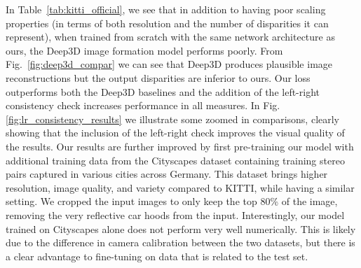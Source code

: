 \documentclass[10pt,twocolumn,letterpaper]{article}
\begin{document}
In Table~\ref{tab:kitti_official}, we see that in addition to having poor scaling properties (in terms of both resolution and the number of disparities it can represent), when trained from scratch with the same network architecture as ours, the Deep3D \cite{xie2016deep3d} image formation model performs poorly.
From Fig.~\ref{fig:deep3d_compar} we can see that Deep3D produces plausible image reconstructions but the output disparities are inferior to ours.
Our loss outperforms both the Deep3D baselines and the addition of the left-right consistency check increases performance in all measures.
In Fig. \ref{fig:lr_consistency_results} we illustrate some zoomed in comparisons, clearly showing that the inclusion of the left-right check improves the visual quality of the results. 
Our results are further improved by first pre-training our model with additional training data from the Cityscapes dataset \cite{Cordts2016Cityscapes} containing  training stereo pairs captured in various cities across Germany. 
This dataset brings higher resolution, image quality, and variety compared to KITTI, while having a similar setting. 
We cropped the input images to only keep the top 80\% of the image, removing the very reflective car hoods from the input.
Interestingly, our model trained on Cityscapes alone does not perform very well numerically. 
This is likely due to the difference in camera calibration between the two datasets, but there is a clear advantage to fine-tuning on data that is related to the test set.
\end{document}
